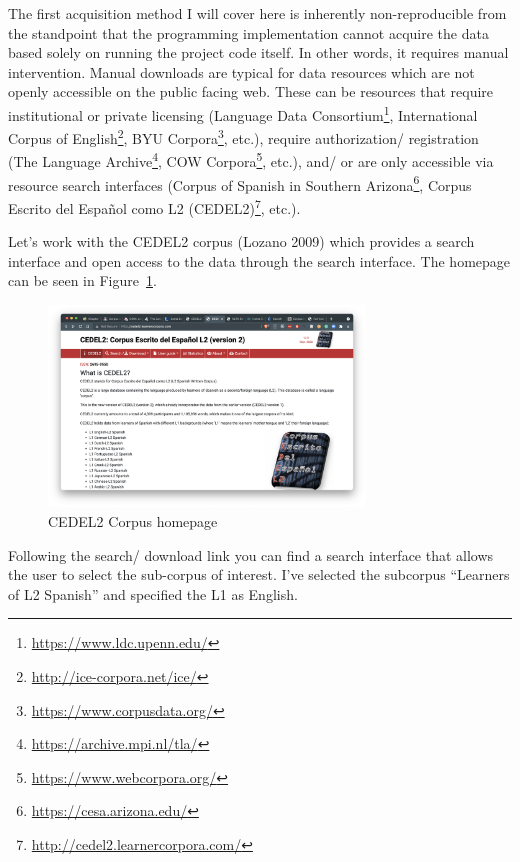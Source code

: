 \documentclass[
  letterpaper,
]{latex/krantz}
\DeclareRobustCommand{\href}[2]{#2\footnote{\url{#1}}}
\begin{document}
The first acquisition method I will cover here is inherently
non-reproducible from the standpoint that the programming implementation
cannot acquire the data based solely on running the project code itself.
In other words, it requires manual intervention. Manual downloads are
typical for data resources which are not openly accessible on the public
facing web. These can be resources that require institutional or private
licensing (\href{https://www.ldc.upenn.edu/}{Language Data Consortium},
\href{http://ice-corpora.net/ice/}{International Corpus of English},
\href{https://www.corpusdata.org/}{BYU Corpora}, etc.), require
authorization/ registration (\href{https://archive.mpi.nl/tla/}{The
Language Archive}, \href{https://www.webcorpora.org/}{COW Corpora},
etc.), and/ or are only accessible via resource search interfaces
(\href{https://cesa.arizona.edu/}{Corpus of Spanish in Southern
Arizona}, \href{http://cedel2.learnercorpora.com/}{Corpus Escrito del
Español como L2 (CEDEL2)}, etc.).

Let's work with the CEDEL2 corpus (Lozano 2009) which provides a search
interface and open access to the data through the search interface. The
homepage can be seen in Figure~\ref{fig-ad-show-page-cedel2-1}.

\begin{figure}[h]

{\centering \includegraphics[width=0.75\textwidth,height=\textheight]{figures/acquire-data/ad-cedel2-site.png}

}

\caption{\label{fig-ad-show-page-cedel2-1}CEDEL2 Corpus homepage}

\end{figure}

Following the search/ download link you can find a search interface that
allows the user to select the sub-corpus of interest. I've selected the
subcorpus ``Learners of L2 Spanish'' and specified the L1 as English.
\end{document}
